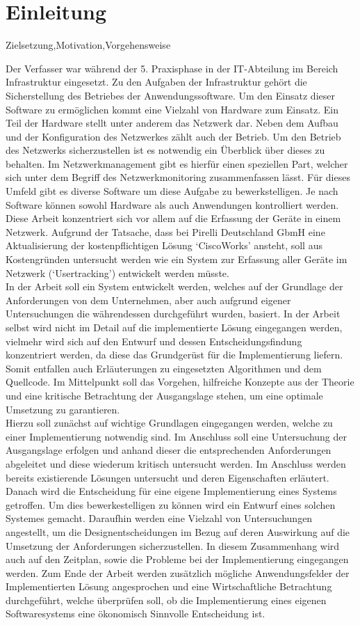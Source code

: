 \chapter{Einleitung}
\label{cha:Einleitung}

Zielsetzung,Motivation,Vorgehensweise

Der Verfasser war während der 5. Praxisphase in der IT-Abteilung im Bereich Infrastruktur eingesetzt.
Zu den Aufgaben der Infrastruktur gehört die Sicherstellung des Betriebes der Anwendungssoftware. Um den Einsatz dieser Software zu ermöglichen kommt eine Vielzahl von Hardware zum Einsatz. Ein Teil der Hardware stellt unter anderem das Netzwerk dar. Neben dem Aufbau und der Konfiguration des Netzwerkes zählt auch der Betrieb. Um den Betrieb des Netzwerks sicherzustellen ist es notwendig ein Überblick über dieses zu behalten.
Im Netzwerkmanagement gibt es hierfür einen speziellen Part, welcher sich unter dem Begriff des Netzwerkmonitoring zusammenfassen lässt. Für dieses Umfeld gibt es diverse Software um diese Aufgabe zu bewerkstelligen. Je nach Software können sowohl Hardware als auch Anwendungen kontrolliert werden. Diese Arbeit konzentriert sich vor allem auf die Erfassung der Geräte in einem Netzwerk. Aufgrund der Tatsache, dass bei Pirelli Deutschland GbmH eine Aktualisierung der kostenpflichtigen Lösung ‘CiscoWorks’ ansteht, soll aus Kostengründen untersucht werden wie ein System zur Erfassung aller Geräte im Netzwerk (‘Usertracking’) entwickelt werden müsste.\\
In der Arbeit soll ein System entwickelt werden, welches auf der Grundlage der Anforderungen von dem Unternehmen, aber auch aufgrund eigener Untersuchungen die währendessen durchgeführt wurden, basiert. In der Arbeit selbst wird nicht im Detail auf die implementierte Lösung eingegangen werden, vielmehr wird sich auf den Entwurf und dessen Entscheidungsfindung konzentriert werden, da diese das Grundgerüst für die Implementierung liefern. Somit entfallen auch Erläuterungen zu eingesetzten Algorithmen und dem Quellcode.
Im Mittelpunkt soll das Vorgehen, hilfreiche Konzepte aus der Theorie und eine kritische Betrachtung der Ausgangslage stehen, um eine optimale Umsetzung zu garantieren.\\
Hierzu soll zunächst auf wichtige Grundlagen eingegangen werden, welche zu einer Implementierung notwendig sind. Im Anschluss soll eine Untersuchung der Ausgangslage erfolgen und anhand dieser die entsprechenden Anforderungen abgeleitet und diese wiederum kritisch untersucht werden. Im Anschluss werden bereits existierende Lösungen untersucht und deren Eigenschaften erläutert. Danach wird die Entscheidung für eine eigene Implementierung eines Systems getroffen. Um dies bewerkestelligen zu können wird ein Entwurf eines solchen Systemes gemacht. Daraufhin werden eine Vielzahl von Untersuchungen angestellt, um die Designentscheidungen im Bezug auf deren Auswirkung auf die Umsetzung der Anforderungen sicherzustellen. In diesem Zusammenhang wird auch auf den Zeitplan, sowie die Probleme bei der Implementierung eingegangen werden.
Zum Ende der Arbeit werden zusätzlich mögliche Anwendungsfelder der Implementierten Lösung angesprochen und eine Wirtschaftliche Betrachtung durchgeführt, welche überprüfen soll, ob die Implementierung eines eigenen Softwaresystems eine ökonomisch Sinnvolle Entscheidung ist.\\